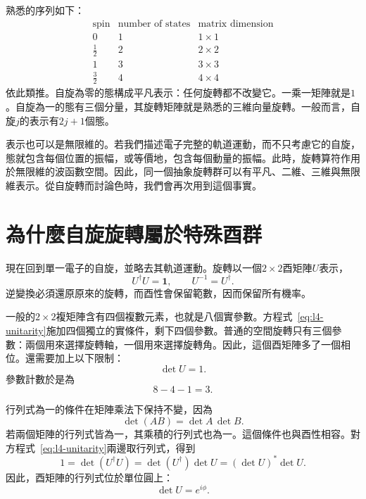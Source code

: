熟悉的序列如下：
\begin{equation}
\begin{array}{c|c|c}
\text{spin} & \text{number of states} & \text{matrix dimension}\\
\hline
0 & 1 & 1\times1\\
\frac12 & 2 & 2\times2\\
1 & 3 & 3\times3\\
\frac32 & 4 & 4\times4
\end{array}
\end{equation}
依此類推。自旋為零的態構成平凡表示：任何旋轉都不改變它。一乘一矩陣就是\(1\)。自旋為一的態有三個分量，其旋轉矩陣就是熟悉的三維向量旋轉。一般而言，自旋\(j\)的表示有\(2j+1\)個態。

表示也可以是無限維的。若我們描述電子完整的軌道運動，而不只考慮它的自旋，態就包含每個位置的振幅，或等價地，包含每個動量的振幅。此時，旋轉算符作用於無限維的波函數空間。因此，同一個抽象旋轉群可以有平凡、二維、三維與無限維表示。從自旋轉而討論色時，我們會再次用到這個事實。

\section{為什麼自旋旋轉屬於特殊酉群}

現在回到單一電子的自旋，並略去其軌道運動。旋轉以一個\(2\times2\)酉矩陣\(U\)表示，
\begin{equation}
U^\dagger U=\boldsymbol 1,
\qquad
U^{-1}=U^\dagger.
\label{eq:l4-unitarity}
\end{equation}
逆變換必須還原原來的旋轉，而酉性會保留範數，因而保留所有機率。

一般的\(2\times2\)複矩陣含有四個複數元素，也就是八個實參數。方程式~\eqref{eq:l4-unitarity}施加四個獨立的實條件，剩下四個參數。普通的空間旋轉只有三個參數：兩個用來選擇旋轉軸，一個用來選擇旋轉角。因此，這個酉矩陣多了一個相位。還需要加上以下限制：
\begin{equation}
\det U=1.
\label{eq:l4-det-one}
\end{equation}
參數計數於是為
\begin{equation}
8-4-1=3.
\end{equation}

行列式為一的條件在矩陣乘法下保持不變，因為
\begin{equation}
\det(AB)=\det A\,\det B.
\end{equation}
若兩個矩陣的行列式皆為一，其乘積的行列式也為一。這個條件也與酉性相容。對方程式~\eqref{eq:l4-unitarity}兩邊取行列式，得到
\begin{equation}
1=\det(U^\dagger U)
=\det(U^\dagger)\det U
=(\det U)^*\det U.
\end{equation}
因此，酉矩陣的行列式位於單位圓上：
\begin{equation}
\det U=e^{i\phi}.
\end{equation}

